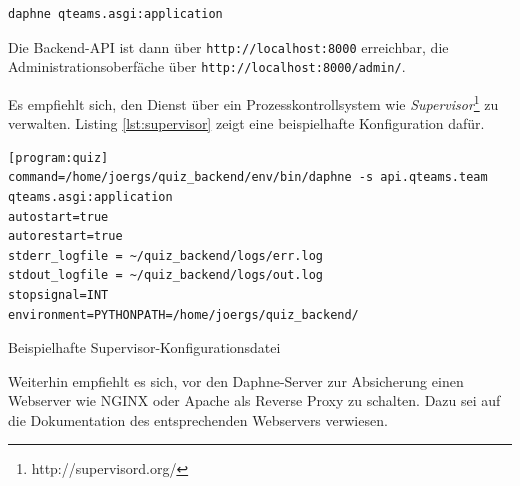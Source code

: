 \documentclass[a4paper,11pt,listof=numbered,glossary=totoc,parskip=half,toc=bib]{scrreprt}
\begin{document}
\begin{appendices}
	\begin{verbatim}
daphne qteams.asgi:application
	\end{verbatim}
	
	Die Backend-API ist dann über \texttt{http://localhost:8000} erreichbar, die Administrationsoberfäche über \texttt{http://localhost:8000/admin/}.
	
	Es empfiehlt sich, den Dienst über ein Prozesskontrollsystem wie \textit{Supervisor}\footnote{http://supervisord.org/} zu verwalten. Listing \ref{lst:supervisor} zeigt eine beispielhafte Konfiguration dafür.
	
	\begin{listing}
		\begin{verbatim}
[program:quiz]
command=/home/joergs/quiz_backend/env/bin/daphne -s api.qteams.team qteams.asgi:application
autostart=true
autorestart=true
stderr_logfile = ~/quiz_backend/logs/err.log
stdout_logfile = ~/quiz_backend/logs/out.log
stopsignal=INT
environment=PYTHONPATH=/home/joergs/quiz_backend/
		\end{verbatim}
		\caption{Beispielhafte Supervisor-Konfigurationsdatei}
		\label{lst:supervisor}
	\end{listing}
	
	Weiterhin empfiehlt es sich, vor den Daphne-Server zur Absicherung einen Webserver wie NGINX oder Apache als Reverse Proxy zu schalten. Dazu sei auf die Dokumentation des entsprechenden Webservers verwiesen.
	

	
	\end{appendices}
	\newpage	
	\setcounter{chapter}{\thelastRomanCounter} %
\renewcommand \thechapter{\Roman{chapter}}	\printbibliography[heading=bibnumbered,title=Literaturverzeichnis]
\end{document}
